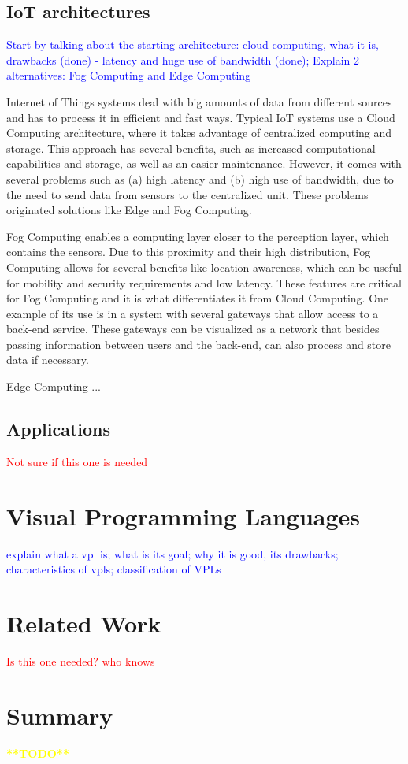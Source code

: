 \subsection{IoT architectures}\label{sec:architectures}

\textcolor{blue}{Start by talking about the starting architecture: cloud computing, what it is, drawbacks (done) - latency and huge use of bandwidth (done); Explain 2 alternatives: Fog Computing and Edge Computing}

Internet of Things systems deal with big amounts of data from different sources and has to process it in efficient and fast ways. Typical IoT systems use a Cloud Computing architecture, where it takes advantage of centralized computing and storage. This approach has several benefits, such as increased computational capabilities and storage, as well as an easier maintenance. However, it comes with several problems such as (a) high latency and (b) high use of bandwidth, due to the need to send data from sensors to the centralized unit. \cite{connecting_fog_and_cloud} These problems originated solutions like Edge and Fog Computing.
\par Fog Computing enables a computing layer closer to the perception layer, which contains the sensors. Due to this proximity and their high distribution, Fog Computing allows for several benefits like location-awareness, which can be useful for mobility and security requirements and low latency. These features are critical for Fog Computing and it is what differentiates it from Cloud Computing. One example of its use is in a system with several gateways that allow access to a back-end service. These gateways can be visualized as a network that besides passing information between users and the back-end, can also process and store data if necessary. \cite{fog_computing_book}
\par Edge Computing ...

\subsection{Applications}\label{sec:iot_applications}

\textcolor{red}{Not sure if this one is needed}

\section{Visual Programming Languages}\label{sec:background_vpl}

\textcolor{blue}{explain what a vpl is; what is its goal; why it is good, its drawbacks; characteristics of vpls; classification of VPLs}

\section{Related Work}

\textcolor{red}{Is this one needed? who knows}

\section{Summary}

\textcolor{yellow}{\textbf{**TODO**}}
